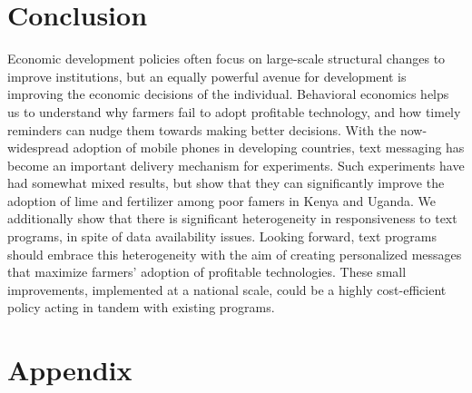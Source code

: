 \documentclass[12pt]{article}
\begin{document}
\section{Conclusion}
\label{section:conclusion}

Economic development policies often focus on large-scale structural changes to improve institutions, but an equally powerful avenue for development is improving the economic decisions of the individual. Behavioral economics helps us to understand why farmers fail to adopt profitable technology, and how timely reminders can nudge them towards making better decisions. With the now-widespread adoption of mobile phones in developing countries, text messaging has become an important delivery mechanism for experiments. Such experiments have had somewhat mixed results, but \textcite{fabregas_digital_2025} show that they can significantly improve the adoption of lime and fertilizer among poor famers in Kenya and Uganda. We additionally show that there is significant heterogeneity in responsiveness to text programs, in spite of data availability issues. Looking forward, text programs should embrace this heterogeneity with the aim of creating personalized messages that maximize farmers' adoption of profitable technologies. These small improvements, implemented at a national scale, could be a highly cost-efficient policy acting in tandem with existing programs.

\newpage
\printbibliography
\newpage

\section{Appendix}
\end{document}
